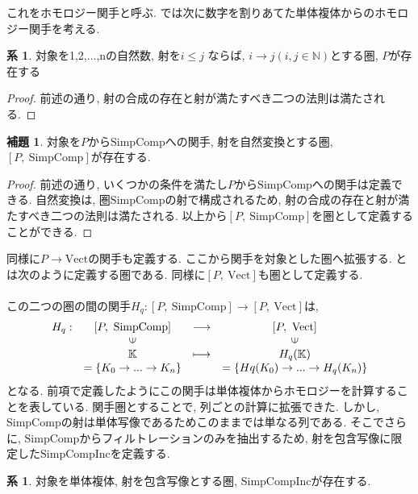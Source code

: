 \documentclass[a4paper]{jsarticle}
\theoremstyle{definition}
\newtheorem{lem}[dfn]{補題}
\newtheorem{cor}[dfn]{系}
\newcommand{\SimpComp}{{\mathrm{SimpComp}}}
\newcommand{\Fun}[2]{[#1,~#2]}
\newcommand{\Vect}{{\mathrm{Vect}}}
\newcommand{\SimpCompInc}{{\mathrm{SimpCompInc}}}
\begin{document}
これをホモロジー関手と呼ぶ. では次に数字を割りあてた単体複体からのホモロジー関手を考える.
\begin{cor}
    対象を1,2,...,nの自然数, 射を$i \leq j$ ならば,  $i\rightarrow j(i, j \in \mathbb{N})$とする圏, $P$が存在する
\end{cor}
\begin{proof}
    前述の通り, 射の合成の存在と射が満たすべき二つの法則は満たされる.
\end{proof}  
\begin{lem}
    対象を$P$から$\SimpComp$への関手, 射を自然変換とする圏, $\Fun{P}{\SimpComp}$が存在する.
\end{lem}
\begin{proof}
    前述の通り, いくつかの条件を満たし$P$から$\SimpComp$への関手は定義できる. 自然変換は, 圏$\SimpComp$の射で構成されるため, 射の合成の存在と射が満たすべき二つの法則は満たされる. 以上から$\Fun{P}{\SimpComp}$を圏として定義することができる.
\end{proof}
同様に$P \rightarrow \Vect$の関手も定義する. ここから関手を対象とした圏へ拡張する. とは次のように定義する圏である.  同様に$\Fun{P}{\Vect}$も圏として定義する. \\
\noindent\\
この二つの圏の間の関手$H_q:\Fun{P}{\SimpComp}\rightarrow \Fun{P}{\Vect}$は,
\begin{equation}
    \begin{array}{cccc}
         H_q:& \Fun{P}{\SimpComp} & \longrightarrow & \Fun{P}{\Vect} \\
        & \rotatebox{90}{$\in$} & & \rotatebox{90}{$\in$} \\
        & \mathbb{K}& \longmapsto & H_q(\mathbb{K})\\
         & =\{K_0\rightarrow ...\rightarrow K_n\} &  & =\{Hq(K_0)\rightarrow ...\rightarrow H_q(K_n)\}\\
    \end{array}
\end{equation}
となる. 前項で定義したようにこの関手は単体複体からホモロジーを計算することを表している. 関手圏とすることで, 列ごとの計算に拡張できた. しかし, SimpCompの射は単体写像であるためこのままでは単なる列である. 
そこでさらに, $\SimpComp$からフィルトレーションのみを抽出するため, 射を包含写像に限定した$\SimpCompInc$を定義する. 
\begin{cor}
    対象を単体複体, 射を包含写像とする圏, $\SimpCompInc$が存在する.
\end{cor}
\end{document}
